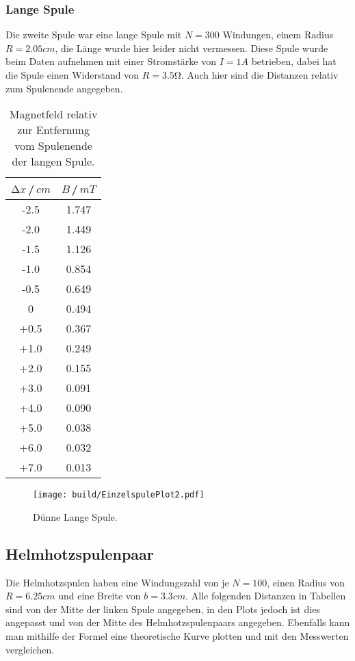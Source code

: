     \subsubsection{Lange Spule}
    Die zweite Spule war eine lange Spule mit $N=300$ Windungen, einem Radius $R=2.05\unit{cm}$, die Länge wurde hier leider nicht vermessen.
    Diese Spule wurde beim Daten aufnehmen mit einer Stromstärke von $I=1\unit{A}$ betrieben, dabei hat die Spule einen Widerstand von $R=3.5 \unit{\ohm}$.
    Auch hier sind die Distanzen relativ zum Spulenende angegeben.
    \begin{table}[H]
        \centering
        \begin{tabular}{c c}
            \toprule
            $\increment x$\,/\,$\unit{cm}$& $B$\,/\,$\unit{mT}$\\
            \midrule
            -2.5  &  1.747\\
            -2.0  &  1.449\\
            -1.5  &  1.126\\
            -1.0  &  0.854\\
            -0.5  &  0.649\\
             0    &  0.494\\
            +0.5  &  0.367\\
            +1.0  &  0.249\\
            +2.0  &  0.155\\
            +3.0  &  0.091\\
            +4.0  &  0.090\\
            +5.0  &  0.038\\
            +6.0  &  0.032\\
            +7.0  &  0.013\\
            \bottomrule
        \end{tabular}
        \caption{Magnetfeld relativ zur Entfernung vom Spulenende der langen Spule.}
        \label{tab:EinzelSpuleTab2}
    \end{table}
    \begin{figure}[H]
        \centering
        \texttt{[image: build/EinzelspulePlot2.pdf]}
        \caption{Dünne Lange Spule.}
        \label{fig:EinzelSpulePlot2}
    \end{figure}

    \label{sec:AuswEinzel}
\subsection{Helmhotzspulenpaar}
    Die Helmhotzspulen haben eine Windungszahl von je $N=100$, einen Radius von $R=6.25\unit{cm}$ und eine Breite von $b=3.3\unit{cm}$.
    Alle folgenden Distanzen in Tabellen sind von der Mitte der linken Spule angegeben, in den Plots jedoch ist dies angepasst und von der Mitte des Helmhotzspulenpaars angegeben.
    Ebenfalls kann man mithilfe der Formel eine theoretische Kurve plotten und mit den Messwerten vergleichen.
